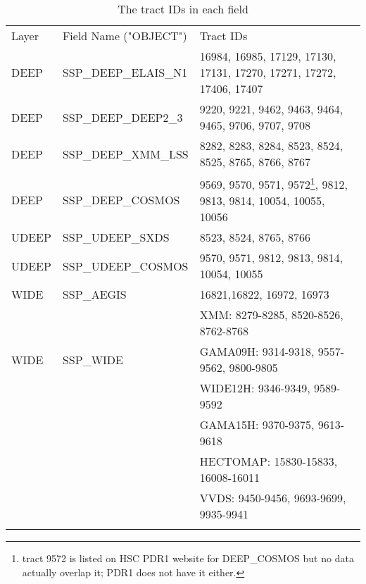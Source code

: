 \begin{longtable}{lll}
Layer & Field Name ("OBJECT") & Tract IDs \\
DEEP & SSP{\_}DEEP{\_}ELAIS{\_}N1 & 16984, 16985, 17129, 17130, 17131, 17270, 17271, 17272, 17406, 17407 \\
DEEP & SSP{\_}DEEP{\_}DEEP2{\_}3 & 9220, 9221, 9462, 9463, 9464, 9465, 9706, 9707, 9708 \\
DEEP & SSP{\_}DEEP{\_}XMM{\_}LSS & 8282, 8283, 8284, 8523, 8524, 8525, 8765, 8766, 8767 \\
DEEP & SSP{\_}DEEP{\_}COSMOS & 9569, 9570, 9571, 9572\footnote{tract 9572 is listed on HSC PDR1 website for DEEP{\_}COSMOS but no data actually overlap it; PDR1 does not have it either.}, 9812, 9813, 9814, 10054, 10055, 10056 \\
UDEEP&SSP{\_}UDEEP{\_}SXDS& 8523, 8524, 8765, 8766 \\
UDEEP & SSP{\_}UDEEP{\_}COSMOS& 9570, 9571, 9812, 9813, 9814, 10054, 10055 \\
WIDE&SSP{\_}AEGIS& 16821,16822, 16972, 16973 \\
\multirow{3}{*}{WIDE} & \multirow{3}{*}{SSP{\_}WIDE}
& XMM: 8279-8285, 8520-8526, 8762-8768 \\
&&GAMA09H: 9314-9318, 9557-9562, 9800-9805 \\
&&WIDE12H: 9346-9349, 9589-9592 \\
&&GAMA15H: 9370-9375, 9613-9618 \\
&&HECTOMAP: 15830-15833, 16008-16011 \\
&&VVDS: 9450-9456, 9693-9699, 9935-9941 \\
\caption{The tract IDs in each field}\label{tab:tractIds}
\end{longtable}
